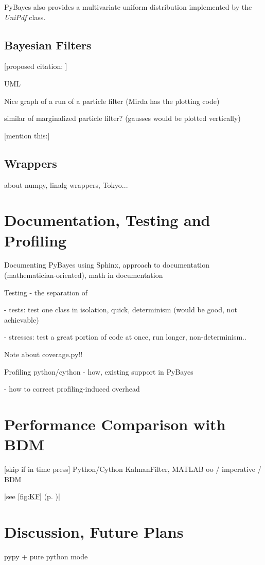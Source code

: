 PyBayes also provides a multivariate uniform distribution implemented by the \emph{UniPdf} class.

\subsection{Bayesian Filters}

[proposed citation: \cite{Smi:05}]

UML

Nice graph of a run of a particle filter (Mirda has the plotting code)

similar of marginalized particle filter? (gausses would be plotted vertically)

[mention this:\cite{Smi:10}]

\subsection{Wrappers} \label{sec:PyBayesWrappers}

about numpy, linalg wrappers, Tokyo...

\section{Documentation, Testing and Profiling} \label{sec:PyBayesDocsTests}

Documenting PyBayes using Sphinx, approach to documentation (mathematician-oriented), math in documentation

Testing - the separation of

- tests: test one class in isolation, quick, determinism (would be good, not achievable)

- stresses: test a great portion of code at once, run longer, non-determinism..

Note about coverage.py!!

Profiling python/cython - how, existing support in PyBayes

- how to correct profiling-induced overhead

\section{Performance Comparison with BDM} \label{sec:PyBayesPerformance}

[skip if in time press]
Python/Cython KalmanFilter, MATLAB oo / imperative / BDM

|see \autoref{fig:KF} (p. \pageref{fig:KF})|

\section{Discussion, Future Plans}

pypy + pure python mode
